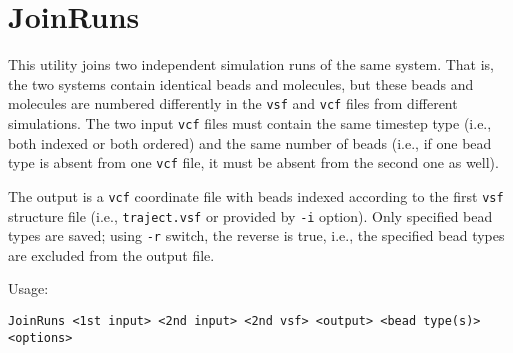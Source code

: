 \section{JoinRuns} \label{sec:JoinRuns}

This utility joins two independent simulation runs of the same system.
That is, the two systems contain identical beads and molecules, but these
beads and molecules are numbered differently in the \texttt{vsf} and
\texttt{vcf} files from different simulations. The two input \texttt{vcf}
files must contain the same timestep type (i.e., both indexed or both
ordered) and the same number of beads (i.e., if one bead type is absent
from one \texttt{vcf} file, it must be absent from the second one as well).

The output is a \texttt{vcf} coordinate file with beads indexed according
to the first \texttt{vsf} structure file (i.e., \texttt{traject.vsf} or
provided by \texttt{-i} option). Only specified bead types are saved; using
\texttt{-r} switch, the reverse is true, i.e., the specified bead types are
excluded from the output file.

Usage:

\vspace{1em}
\noindent
\texttt{JoinRuns <1st input> <2nd input> <2nd vsf> <output> <bead type(s)> \\ <options>}

